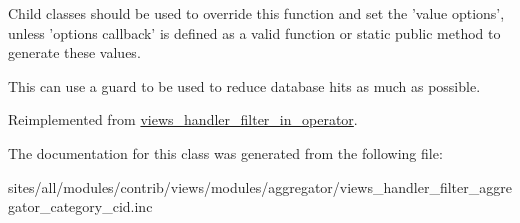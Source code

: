 Child classes should be used to override this function and set the 'value options', unless 'options callback' is defined as a valid function or static public method to generate these values.

This can use a guard to be used to reduce database hits as much as possible. 

Reimplemented from \hyperlink{classviews__handler__filter__in__operator_a5b5df6d90f4359ed28c0c446bdc81a6}{views\_\-handler\_\-filter\_\-in\_\-operator}.

The documentation for this class was generated from the following file:\begin{CompactItemize}
\item 
sites/all/modules/contrib/views/modules/aggregator/views\_\-handler\_\-filter\_\-aggregator\_\-category\_\-cid.inc\end{CompactItemize}
